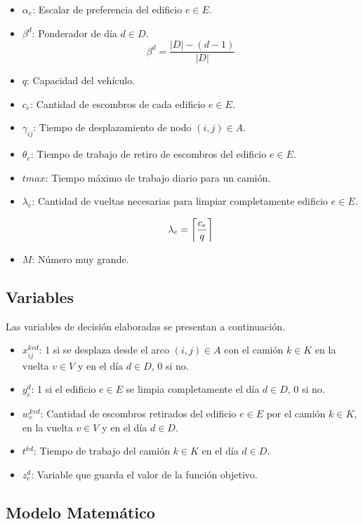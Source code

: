 \documentclass[letterpaper,conference]{IEEEtran}
\DeclarePairedDelimiter\ceil{\lceil}{\rceil}
\begin{document}
\begin{itemize}
	\item $\alpha_e$: Escalar de preferencia del edificio $e \in E$.
	\item $\beta^{d}$: Ponderador de día $d \in D$.
	\[ \beta^d = \dfrac{|D|-(d-1)}{|D|} \]
	\item $q$: Capacidad del vehículo. 
	\item $c_e$: Cantidad de escombros de cada edificio $e \in E$.
	\item $\gamma_{ij}$: Tiempo de desplazamiento de nodo $(i,j) \in A$.
	\item $\theta_{e}$: Tiempo de trabajo de retiro de escombros del edificio $e \in E$.
	\item $tmax$: Tiempo máximo de trabajo diario para un camión.
	\item $\lambda_e$: Cantidad de vueltas necesarias para limpiar completamente edificio $e \in E$.

	\[ \lambda_e = \ceil*{ \frac{ c_e }{q} } \]
	\item $M$: Número muy grande.
\end{itemize}

\subsection{Variables}
Las variables de decisión elaboradas se presentan a continuación.

\begin{itemize}
	\item $x_{ij}^{kvd}$: 1 si se desplaza desde el arco $(i,j) \in A$	con el camión $k \in K$ en la vuelta $v \in V$ y en el día $d \in D$, 0 si no.
	\item $y_{e}^{d}$: 1 si el edificio $e \in E$ se limpia completamente el día $d \in D$, 0 si no.
	\item $w_{e}^{kvd}$: Cantidad de escombros retirados del edificio $e \in E$ por el camión $k \in K$, en la vuelta $v \in V$ y en el día $d \in D$.
	\item $t^{kd}$: Tiempo de trabajo del camión $k \in K$ en el día $d \in D$.
	\item $z_e^d$: Variable que guarda el valor de la función objetivo. %
\end{itemize}

\subsection{Modelo Matemático}
\end{document}
